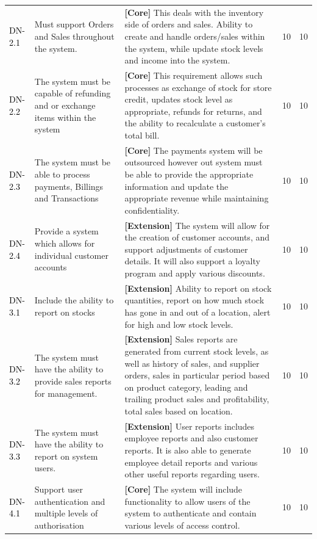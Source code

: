 \documentclass[a4paper]{article}
\begin{document}
\begin{longtable}{|l|p{5cm}|p{7cm}|p{0.5cm}|p{0.5cm}|}
  \hline
  \textcolor{black}{DN-2.1} &  Must support Orders and Sales throughout the system. & \textbf{[Core] }This deals with the inventory side of orders and sales. Ability to create and handle orders/sales within the system, while update stock levels and income into the system.& 10 & 10\\
  \textcolor{black}{DN-2.2} &  The system must be capable of refunding and or exchange items within the system & \textbf{[Core] }This requirement allows such processes as exchange of stock for store credit, updates stock level as appropriate, refunds for returns, and the ability to recalculate a customer's total bill.& 10 & 10\\
  \textcolor{black}{DN-2.3} & The system must be able to process payments, Billings and Transactions & \textbf{[Core] }The payments system will be outsourced however out system must be able to provide the appropriate information and update the appropriate revenue while maintaining confidentiality.& 10 & 10\\
  \textcolor{black}{DN-2.4} & Provide a system which allows for individual customer accounts & \textbf{[Extension] }The system will allow for the creation of customer accounts, and support adjustments of customer details. It will also support a loyalty program and apply various discounts.& 10 & 10\\
  \hline
  \textcolor{black}{DN-3.1} &  Include the ability to report on stocks & \textbf{[Extension] }Ability to report on stock quantities, report on how much stock has gone in and out of a location, alert for high and low stock levels.& 10 & 10\\
  \textcolor{black}{DN-3.2} & The system must have the ability to provide sales reports for management. & \textbf{[Extension] }Sales reports are generated from current stock levels, as well as history of sales, and supplier orders, sales in particular period based on product category,
leading and trailing product sales and profitability, total sales based on location. & 10 & 10\\
\textcolor{black}{DN-3.3} & The system must have the ability to report on system users. & \textbf{[Extension] }User reports includes employee reports and also customer reports. It is also able to generate employee detail reports and various other useful reports regarding users.& 10 & 10\\
\hline
  \textcolor{black}{DN-4.1} &  Support user authentication and multiple levels of authorisation & \textbf{[Core] }The system will include functionality to allow users of the system to authenticate and contain various levels of access control.& 10 & 10\\

\end{longtable}
\end{document}
